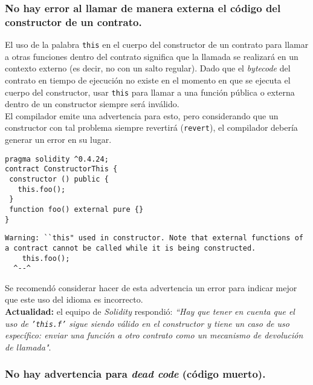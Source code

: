 \subsubsection{No hay error al llamar de manera externa el código del constructor de un contrato.}

El uso de la palabra \texttt{this} en el cuerpo del constructor de un contrato para llamar a otras funciones dentro del contrato significa que la llamada se realizará en un contexto externo (es decir, no con un salto regular). Dado que el \textit{bytecode} del contrato en tiempo de ejecución no existe en el momento en que se ejecuta el cuerpo del constructor, usar \texttt{this} para llamar a una función pública o externa dentro de un constructor siempre será inválido.\\

El compilador emite una advertencia para esto, pero considerando que un constructor con tal problema siempre revertirá (\texttt{revert}), el compilador debería generar un error en su lugar.\\

\begin{lstlisting}[language=Solidity, caption={Código de ejemplo que debería emitir error}]
pragma solidity ^0.4.24;
contract ConstructorThis {
 constructor () public {
   this.foo();
 }
 function foo() external pure {}
}
\end{lstlisting}

\begin{lstlisting}[caption={Mensaje de salida emitiendo advertencia}]
Warning: ``this" used in constructor. Note that external functions of a contract cannot be called while it is being constructed.
	this.foo();
  ^--^
\end{lstlisting}  

Se recomendó considerar hacer de esta advertencia un error para indicar mejor que este uso del idioma es incorrecto.\\

\textbf{Actualidad:} el equipo de \textit{Solidity} respondió: \textit{``Hay que tener en cuenta que el uso de \texttt{'this.f'} sigue siendo válido en el constructor y tiene un caso de uso específico: enviar una función a otro contrato como un mecanismo de devolución de llamada"}.\\

\subsubsection{No hay advertencia para \textit{dead code} (código muerto).}

